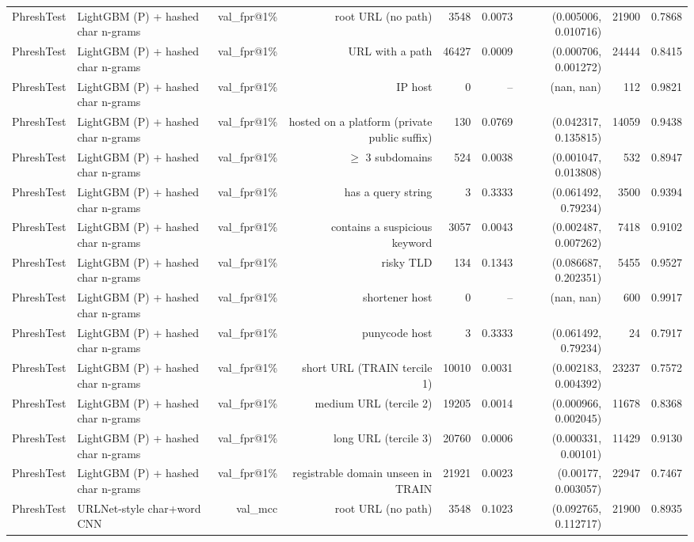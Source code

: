 \begin{table}[t]
\begin{tabular}{llrrrrrrr}
PhreshTest & LightGBM (P) + hashed char n-grams & val\_fpr@1\% & root URL (no path) & 3548 & 0.0073 & (0.005006, 0.010716) & 21900 & 0.7868 \\
PhreshTest & LightGBM (P) + hashed char n-grams & val\_fpr@1\% & URL with a path & 46427 & 0.0009 & (0.000706, 0.001272) & 24444 & 0.8415 \\
PhreshTest & LightGBM (P) + hashed char n-grams & val\_fpr@1\% & IP host & 0 & -- & (nan, nan) & 112 & 0.9821 \\
PhreshTest & LightGBM (P) + hashed char n-grams & val\_fpr@1\% & hosted on a platform (private public suffix) & 130 & 0.0769 & (0.042317, 0.135815) & 14059 & 0.9438 \\
PhreshTest & LightGBM (P) + hashed char n-grams & val\_fpr@1\% & $\geq$ 3 subdomains & 524 & 0.0038 & (0.001047, 0.013808) & 532 & 0.8947 \\
PhreshTest & LightGBM (P) + hashed char n-grams & val\_fpr@1\% & has a query string & 3 & 0.3333 & (0.061492, 0.79234) & 3500 & 0.9394 \\
PhreshTest & LightGBM (P) + hashed char n-grams & val\_fpr@1\% & contains a suspicious keyword & 3057 & 0.0043 & (0.002487, 0.007262) & 7418 & 0.9102 \\
PhreshTest & LightGBM (P) + hashed char n-grams & val\_fpr@1\% & risky TLD & 134 & 0.1343 & (0.086687, 0.202351) & 5455 & 0.9527 \\
PhreshTest & LightGBM (P) + hashed char n-grams & val\_fpr@1\% & shortener host & 0 & -- & (nan, nan) & 600 & 0.9917 \\
PhreshTest & LightGBM (P) + hashed char n-grams & val\_fpr@1\% & punycode host & 3 & 0.3333 & (0.061492, 0.79234) & 24 & 0.7917 \\
PhreshTest & LightGBM (P) + hashed char n-grams & val\_fpr@1\% & short URL (TRAIN tercile 1) & 10010 & 0.0031 & (0.002183, 0.004392) & 23237 & 0.7572 \\
PhreshTest & LightGBM (P) + hashed char n-grams & val\_fpr@1\% & medium URL (tercile 2) & 19205 & 0.0014 & (0.000966, 0.002045) & 11678 & 0.8368 \\
PhreshTest & LightGBM (P) + hashed char n-grams & val\_fpr@1\% & long URL (tercile 3) & 20760 & 0.0006 & (0.000331, 0.00101) & 11429 & 0.9130 \\
PhreshTest & LightGBM (P) + hashed char n-grams & val\_fpr@1\% & registrable domain unseen in TRAIN & 21921 & 0.0023 & (0.00177, 0.003057) & 22947 & 0.7467 \\
PhreshTest & URLNet-style char+word CNN & val\_mcc & root URL (no path) & 3548 & 0.1023 & (0.092765, 0.112717) & 21900 & 0.8935 \\

\end{tabular}
\end{table}
